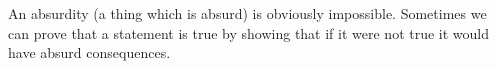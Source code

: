 An absurdity (a thing which is absurd) is obviously impossible.
Sometimes we can prove that a statement is true by showing that
if it were not true it would have absurd consequences.
